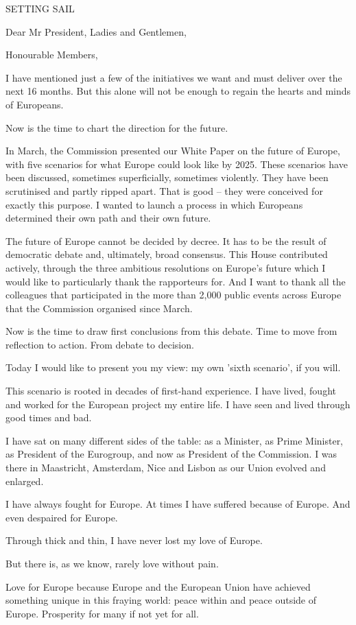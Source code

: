 \documentclass[a4paper,11pt]{article}
\begin{document}
SETTING SAIL

Dear Mr President, Ladies and Gentlemen,

Honourable Members,

I have mentioned just a few of the initiatives we want and must deliver over the next 16 months. But this alone will not be enough to regain the hearts and minds of Europeans.

Now is the time to chart the direction for the future.

In March, the Commission presented our White Paper on the future of Europe, with five scenarios for what Europe could look like by 2025. These scenarios have been discussed, sometimes superficially, sometimes violently. They have been scrutinised and partly ripped apart. That is good – they were conceived for exactly this purpose. I wanted to launch a process in which Europeans determined their own path and their own future.

The future of Europe cannot be decided by decree. It has to be the result of democratic debate and, ultimately, broad consensus. This House contributed actively, through the three ambitious resolutions on Europe's future which I would like to particularly thank the rapporteurs for. And I want to thank all the colleagues that participated in the more than 2,000 public events across Europe that the Commission organised since March.

Now is the time to draw first conclusions from this debate. Time to move from reflection to action. From debate to decision.

Today I would like to present you my view: my own 'sixth scenario', if you will.

This scenario is rooted in decades of first-hand experience. I have lived, fought and worked for the European project my entire life. I have seen and lived through good times and bad.

I have sat on many different sides of the table: as a Minister, as Prime Minister, as President of the Eurogroup, and now as President of the Commission. I was there in Maastricht, Amsterdam, Nice and Lisbon as our Union evolved and enlarged.

I have always fought for Europe. At times I have suffered because of Europe. And even despaired for Europe.

Through thick and thin, I have never lost my love of Europe.

But there is, as we know, rarely love without pain.

Love for Europe because Europe and the European Union have achieved something unique in this fraying world: peace within and peace outside of Europe. Prosperity for many if not yet for all.
\end{document}

